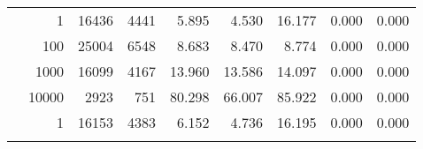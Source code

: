 \begin{table}
\begin{tabular}{rrrrrrrrr}
	            
	        
				\noalign{\smallskip}\hline
				\multirow{ 4 }{*}{ 80000 } &
				
					
					 
					\multirow{ 1 }{*}{ 1 } &
					
						
							    
							     16436  & 4441  
	                           & 5.895 & 4.530 & 16.177
	                           & 0.000 & 0.000  \\
	                
	            
					 &  
					 
					\multirow{ 1 }{*}{ 100 } &
					
						
							    
							     25004  & 6548  
	                           & 8.683 & 8.470 & 8.774
	                           & 0.000 & 0.000  \\
	                
	            
					 &  
					 
					\multirow{ 1 }{*}{ 1000 } &
					
						
							    
							     16099  & 4167  
	                           & 13.960 & 13.586 & 14.097
	                           & 0.000 & 0.000  \\
	                
	            
					 &  
					 
					\multirow{ 1 }{*}{ 10000 } &
					
						
							    
							     2923  & 751  
	                           & 80.298 & 66.007 & 85.922
	                           & 0.000 & 0.000  \\
	                
	            
	        
				\noalign{\smallskip}\hline
				\multirow{ 4 }{*}{ 160000 } &
				
					
					 
					\multirow{ 1 }{*}{ 1 } &
					
						
							    
							     16153  & 4383  
	                           & 6.152 & 4.736 & 16.195
	                           & 0.000 & 0.000  \\
	                
	            
					 &  
					 

\end{tabular}
\end{table}

